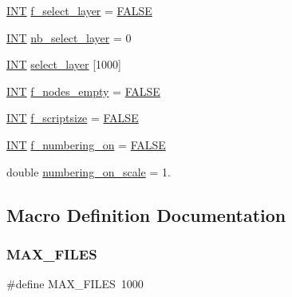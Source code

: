 \begin{DoxyCompactItemize}
\item 
\mbox{\hyperlink{galois_8h_a09fddde158a3a20bd2dcadb609de11dc}{I\+NT}} \mbox{\hyperlink{layered__graph__main_8_c_a7d4ccea5f5ae42b346148ff947c9f93e}{f\+\_\+select\+\_\+layer}} = \mbox{\hyperlink{nauty_8h_aa93f0eb578d23995850d61f7d61c55c1}{F\+A\+L\+SE}}
\item 
\mbox{\hyperlink{galois_8h_a09fddde158a3a20bd2dcadb609de11dc}{I\+NT}} \mbox{\hyperlink{layered__graph__main_8_c_aae8e6f5c00884e6b9f3dab8daa384998}{nb\+\_\+select\+\_\+layer}} = 0
\item 
\mbox{\hyperlink{galois_8h_a09fddde158a3a20bd2dcadb609de11dc}{I\+NT}} \mbox{\hyperlink{layered__graph__main_8_c_a93464a2793277935a8e4fcb57c1d6092}{select\+\_\+layer}} \mbox{[}1000\mbox{]}
\item 
\mbox{\hyperlink{galois_8h_a09fddde158a3a20bd2dcadb609de11dc}{I\+NT}} \mbox{\hyperlink{layered__graph__main_8_c_a066751d6910a84f6dccdbed0d72885e2}{f\+\_\+nodes\+\_\+empty}} = \mbox{\hyperlink{nauty_8h_aa93f0eb578d23995850d61f7d61c55c1}{F\+A\+L\+SE}}
\item 
\mbox{\hyperlink{galois_8h_a09fddde158a3a20bd2dcadb609de11dc}{I\+NT}} \mbox{\hyperlink{layered__graph__main_8_c_ab4636498b3ad108447a762e8cc85f64d}{f\+\_\+scriptsize}} = \mbox{\hyperlink{nauty_8h_aa93f0eb578d23995850d61f7d61c55c1}{F\+A\+L\+SE}}
\item 
\mbox{\hyperlink{galois_8h_a09fddde158a3a20bd2dcadb609de11dc}{I\+NT}} \mbox{\hyperlink{layered__graph__main_8_c_a1f59b1cedc9844e44fe4c372a96b00a2}{f\+\_\+numbering\+\_\+on}} = \mbox{\hyperlink{nauty_8h_aa93f0eb578d23995850d61f7d61c55c1}{F\+A\+L\+SE}}
\item 
double \mbox{\hyperlink{layered__graph__main_8_c_acc1d4e4fd5777c739f85fd8ff4599766}{numbering\+\_\+on\+\_\+scale}} = 1.
\end{DoxyCompactItemize}


\subsection{Macro Definition Documentation}
\mbox{\label{layered__graph__main_8_c_a2c5eecb22513a88c24ae5831a3265e54}} 
\subsubsection{\texorpdfstring{M\+A\+X\+\_\+\+F\+I\+L\+ES}{MAX\_FILES}}
{\footnotesize\ttfamily \#define M\+A\+X\+\_\+\+F\+I\+L\+ES~1000}



